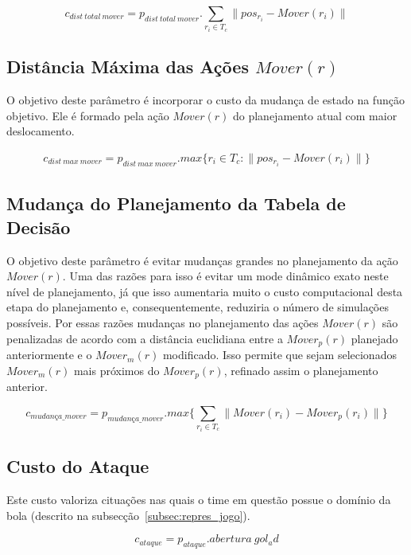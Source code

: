 \begin{dmath} 
 c_{dist{\ }total{\ }mover} = p_{dist{\ }total{\ }mover} . 
 \sum_{r_i \in T_c} \lVert pos_{r_i} - Mover(r_i)\rVert
\end{dmath} 

\subsection{Distância Máxima das Ações $Mover(r)$} 
O objetivo deste parâmetro é incorporar o custo da
mudança de estado na função objetivo. Ele é formado pela
ação $Mover(r)$ do planejamento atual com maior deslocamento.

\begin{gather} 
 c_{dist{\ }max{\ }mover}= p_{dist{\ }max{\ }mover} . 
 max \lbrace r_i \in T_c : \lVert pos_{r_i} - Mover(r_i)\rVert \rbrace
\end{gather} 

\subsection{Mudança do Planejamento da Tabela de Decisão}\label{subsec:change_cost}
O objetivo deste parâmetro é evitar mudanças grandes no
planejamento da ação $Mover(r)$. Uma das razões para isso é evitar um mode dinâmico
exato neste nível de planejamento, já que isso aumentaria muito o custo
computacional desta etapa do planejamento e, consequentemente, reduziria
o número de simulações possíveis. Por essas razões mudanças no planejamento
das ações $Mover(r)$ são penalizadas de acordo com a distância euclidiana
entre a $Mover_p(r)$ planejado anteriormente e o $Mover_{m}(r)$ modificado.
Isso permite que sejam selecionados $Mover_{m}(r)$ mais próximos do
$Mover_p(r)$, refinado assim o planejamento anterior.

\begin{dmath} 
 c_{mudança{\_}mover} = p_{mudança{\_}mover} . 
 max \lbrace \sum_{r_i \in T_c} \lVert Mover(r_i) - Mover_p(r_i)\rVert \rbrace
\end{dmath} 

\subsection{Custo do Ataque}
Este custo valoriza cituações nas quais o time em questão
possue o domínio da bola (descrito na subsecção~\ref{subsec:repres_jogo}).

\begin{dmath} 
 c_{ataque} = p_{ataque} . abertura{\ }gol_ad
\end{dmath} 

